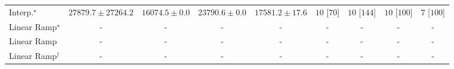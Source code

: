 \begin{tabular}{l|cccc|cccc|}
Interp.$^\star$ & {\cellcolor[HTML]{DEF2A7}} \color[HTML]{000000} $27879.7\pm 27264.2$ & {\cellcolor[HTML]{FDFEDB}} \color[HTML]{000000} $16074.5\pm 0.0$ & {\cellcolor[HTML]{EEF9B3}} \color[HTML]{000000} $23790.6\pm 0.0$ & {\cellcolor[HTML]{FCFED3}} \color[HTML]{000000} $17581.2\pm 17.6$ & {\cellcolor[HTML]{49006A}} \color[HTML]{F1F1F1} $10$ [$70$] & {\cellcolor[HTML]{49006A}} \color[HTML]{F1F1F1} $10$ [$144$] & {\cellcolor[HTML]{49006A}} \color[HTML]{F1F1F1} $10$ [$100$] & {\cellcolor[HTML]{CD238F}} \color[HTML]{F1F1F1} $7$ [$100$] \\
Linear Ramp$^\star$ & {\cellcolor[HTML]{000000}} \color[HTML]{F1F1F1} {\cellcolor{white}} \color{black} - & {\cellcolor[HTML]{000000}} \color[HTML]{F1F1F1} {\cellcolor{white}} \color{black} - & {\cellcolor[HTML]{000000}} \color[HTML]{F1F1F1} {\cellcolor{white}} \color{black} - & {\cellcolor[HTML]{000000}} \color[HTML]{F1F1F1} {\cellcolor{white}} \color{black} - & {\cellcolor[HTML]{000000}} \color[HTML]{F1F1F1} {\cellcolor{white}} \color{black} - & {\cellcolor[HTML]{000000}} \color[HTML]{F1F1F1} {\cellcolor{white}} \color{black} - & {\cellcolor[HTML]{000000}} \color[HTML]{F1F1F1} {\cellcolor{white}} \color{black} - & {\cellcolor[HTML]{000000}} \color[HTML]{F1F1F1} {\cellcolor{white}} \color{black} - \\
Linear Ramp & {\cellcolor[HTML]{000000}} \color[HTML]{F1F1F1} {\cellcolor{white}} \color{black} - & {\cellcolor[HTML]{000000}} \color[HTML]{F1F1F1} {\cellcolor{white}} \color{black} - & {\cellcolor[HTML]{000000}} \color[HTML]{F1F1F1} {\cellcolor{white}} \color{black} - & {\cellcolor[HTML]{000000}} \color[HTML]{F1F1F1} {\cellcolor{white}} \color{black} - & {\cellcolor[HTML]{000000}} \color[HTML]{F1F1F1} {\cellcolor{white}} \color{black} - & {\cellcolor[HTML]{000000}} \color[HTML]{F1F1F1} {\cellcolor{white}} \color{black} - & {\cellcolor[HTML]{000000}} \color[HTML]{F1F1F1} {\cellcolor{white}} \color{black} - & {\cellcolor[HTML]{000000}} \color[HTML]{F1F1F1} {\cellcolor{white}} \color{black} - \\
Linear Ramp$^\dagger$ & {\cellcolor[HTML]{000000}} \color[HTML]{F1F1F1} {\cellcolor{white}} \color{black} - & {\cellcolor[HTML]{000000}} \color[HTML]{F1F1F1} {\cellcolor{white}} \color{black} - & {\cellcolor[HTML]{000000}} \color[HTML]{F1F1F1} {\cellcolor{white}} \color{black} - & {\cellcolor[HTML]{000000}} \color[HTML]{F1F1F1} {\cellcolor{white}} \color{black} - & {\cellcolor[HTML]{000000}} \color[HTML]{F1F1F1} {\cellcolor{white}} \color{black} - & {\cellcolor[HTML]{000000}} \color[HTML]{F1F1F1} {\cellcolor{white}} \color{black} - & {\cellcolor[HTML]{000000}} \color[HTML]{F1F1F1} {\cellcolor{white}} \color{black} - & {\cellcolor[HTML]{000000}} \color[HTML]{F1F1F1} {\cellcolor{white}} \color{black} - \\

\end{tabular}
